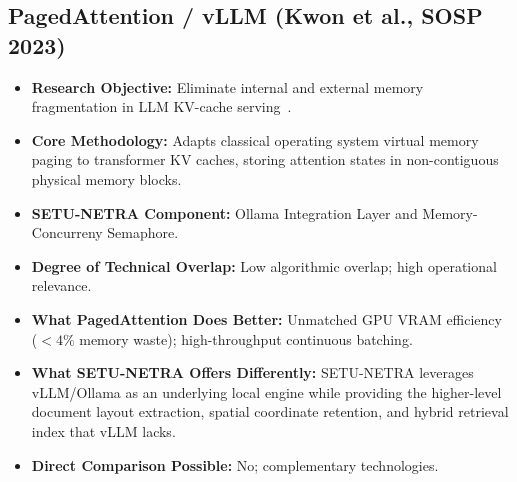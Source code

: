 \documentclass[11pt,a4paper]{article}
\begin{document}
\subsection{PagedAttention / vLLM (Kwon et al., SOSP 2023)}
\begin{itemize}[leftmargin=*]
    \item \textbf{Research Objective:} Eliminate internal and external memory fragmentation in LLM KV-cache serving~\cite{Kwon2023vLLM}.
    \item \textbf{Core Methodology:} Adapts classical operating system virtual memory paging to transformer KV caches, storing attention states in non-contiguous physical memory blocks.
    \item \textbf{SETU-NETRA Component:} Ollama Integration Layer and Memory-Concurreny Semaphore.
    \item \textbf{Degree of Technical Overlap:} Low algorithmic overlap; high operational relevance.
    \item \textbf{What PagedAttention Does Better:} Unmatched GPU VRAM efficiency ($< 4\%$ memory waste); high-throughput continuous batching.
    \item \textbf{What SETU-NETRA Offers Differently:} SETU-NETRA leverages vLLM/Ollama as an underlying local engine while providing the higher-level document layout extraction, spatial coordinate retention, and hybrid retrieval index that vLLM lacks.
    \item \textbf{Direct Comparison Possible:} No; complementary technologies.
\end{itemize}

\end{document}
